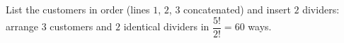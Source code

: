 List the customers in order (lines $1$, $2$, $3$ concatenated) and insert $2$ dividers: arrange $3$ customers and $2$ identical dividers in $\dfrac{5!}{2!}=\boxed{60}$ ways.
